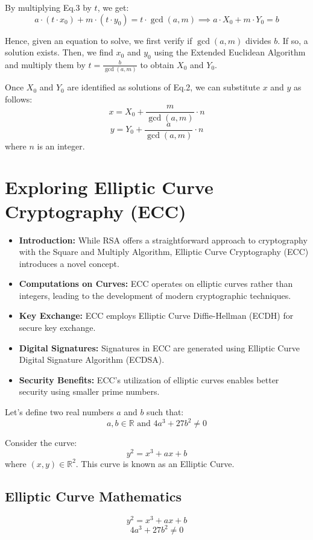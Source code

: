 \documentclass[11pt]{article}
\begin{document}
By multiplying Eq.3 by $t$, we get:
\[ a \cdot (t \cdot x_0) + m \cdot (t \cdot y_0) = t \cdot \gcd(a, m) \implies a \cdot X_0 + m \cdot Y_0 = b \]

Hence, given an equation to solve, we first verify if $\gcd(a, m)$ divides $b$. If so, a solution exists. Then, we find $x_0$ and $y_0$ using the Extended Euclidean Algorithm and multiply them by $t = \frac{b}{\gcd(a,m)}$ to obtain $X_0$ and $Y_0$.

Once $X_0$ and $Y_0$ are identified as solutions of Eq.2, we can substitute $x$ and $y$ as follows:
\[ x = X_0 + \frac{m}{\gcd(a,m)} \cdot n \]
\[ y = Y_0 + \frac{a}{\gcd(a,m)} \cdot n \]
where $n$ is an integer.

\section{Exploring Elliptic Curve Cryptography (ECC)}
\begin{itemize}
\item \textbf{Introduction:} While RSA offers a straightforward approach to cryptography with the Square and Multiply Algorithm, Elliptic Curve Cryptography (ECC) introduces a novel concept.
\item \textbf{Computations on Curves:} ECC operates on elliptic curves rather than integers, leading to the development of modern cryptographic techniques.
\item \textbf{Key Exchange:} ECC employs Elliptic Curve Diffie-Hellman (ECDH) for secure key exchange.
\item \textbf{Digital Signatures:} Signatures in ECC are generated using Elliptic Curve Digital Signature Algorithm (ECDSA).
\item \textbf{Security Benefits:} ECC's utilization of elliptic curves enables better security using smaller prime numbers.
\end{itemize}

Let's define two real numbers $a$ and $b$ such that:
\[ a, b \in \mathbb{R} \text{ and } 4a^3 + 27b^2 \neq 0 \]

Consider the curve:
\[ y^2 = x^3 + ax + b \]
where $(x, y) \in \mathbb{R}^2$. This curve is known as an Elliptic Curve.

\subsection{Elliptic Curve Mathematics}
\[ y^2 = x^3 + ax + b \]
\[ 4a^3 + 27b^2 \neq 0 \]
\end{document}
